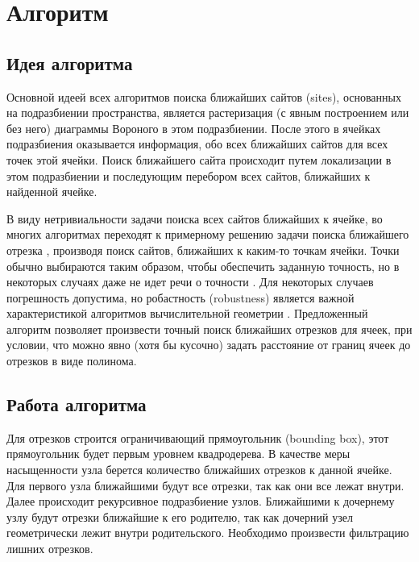 \section{Алгоритм}
\subsection{Идея алгоритма}
Основной идеей всех алгоритмов поиска ближайших сайтов (sites),
основанных на подразбиении пространства, является растеризация (с явным
построением или без него) диаграммы Вороного в этом подразбиении. После
этого в ячейках подразбиения оказывается информация, обо всех ближайших
сайтов для всех точек этой ячейки. Поиск ближайшего сайта происходит
путем локализации в этом подразбиении и последующим перебором всех
сайтов, ближайших к найденной ячейке.

В виду нетривиальности задачи поиска всех сайтов ближайших к ячейке,
во многих алгоритмах переходят к примерному решению задачи поиска
ближайшего отрезка \cite{NGRID}, производя поиск сайтов, ближайших к каким-то
точкам ячейки. Точки обычно выбираются таким образом, чтобы обеспечить
заданную точность, но в некоторых случаях даже не идет речи о точности \cite{AVOR}.
Для некоторых случаев погрешность допустима, но робастность (robustness)
является важной характеристикой алгоритмов вычислительной геометрии \cite{ROBUS}.
Предложенный алгоритм позволяет произвести точный поиск ближайших
отрезков для ячеек, при условии, что можно явно (хотя бы кусочно) задать
расстояние от границ ячеек до отрезков в виде полинома.

\subsection{Работа алгоритма}

Для отрезков строится ограничивающий прямоугольник (bounding box), этот прямоугольник будет первым
уровнем квадродерева. В качестве меры насыщенности узла берется количество
ближайших отрезков к данной ячейке. Для первого узла ближайшими будут все
отрезки, так как они все лежат внутри. Далее происходит рекурсивное
подразбиение узлов. Ближайшими к дочернему узлу будут отрезки ближайшие
к его родителю, так как дочерний узел геометрически лежит внутри
родительского. Необходимо произвести фильтрацию лишних отрезков.

